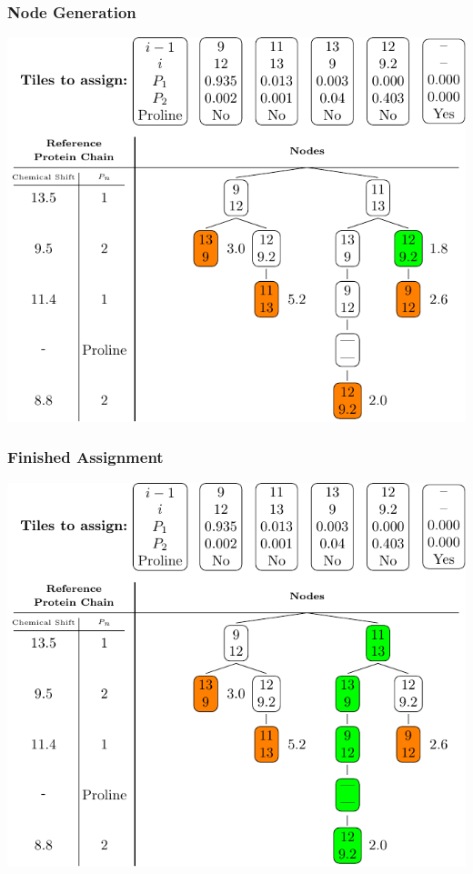 \documentclass{beamer}
\begin{document}
\begin{frame}
	\frametitle{Node Generation}
	\vspace{-.5cm} 
	\center
	\includegraphics[width=.9\textwidth]{tilePlacement/step10}
\end{frame}

\begin{frame}
	\frametitle{Finished Assignment}
	\vspace{-.5cm} 
	\center
	\includegraphics[width=.9\textwidth]{tilePlacement/step11}
\end{frame}
\end{document}
